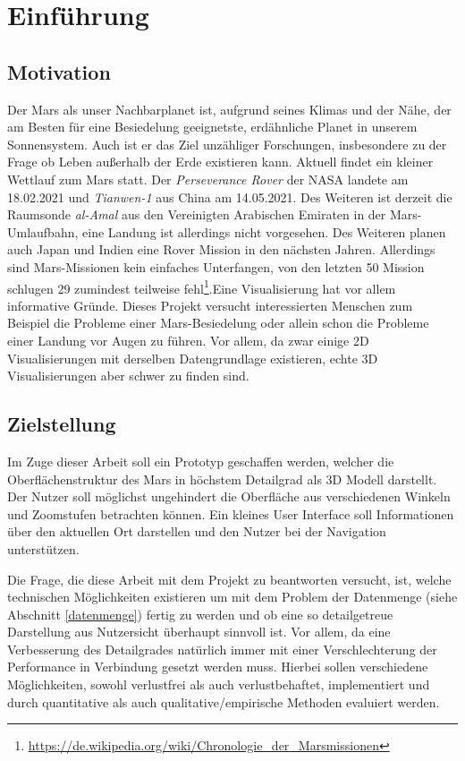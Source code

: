 \chapter{Einführung}

\section{Motivation}
Der Mars als unser Nachbarplanet ist, aufgrund seines Klimas und der Nähe, der am Besten für eine Besiedelung geeignetste, erdähnliche Planet in unserem Sonnensystem. Auch ist er das Ziel unzähliger Forschungen, insbesondere zu der Frage ob Leben außerhalb der Erde existieren kann. Aktuell findet ein kleiner Wettlauf zum Mars statt. Der \textit{Perseverance Rover} der NASA landete am 18.02.2021 und \textit{Tianwen-1} aus China am 14.05.2021. Des Weiteren ist derzeit die Raumsonde \textit{al-Amal} aus den Vereinigten Arabischen Emiraten in der Mars-Umlaufbahn, eine Landung ist allerdings nicht vorgesehen. Des Weiteren planen auch Japan und Indien eine Rover Mission in den nächsten Jahren. Allerdings sind Mars-Missionen kein einfaches Unterfangen, von den letzten 50 Mission schlugen 29 zumindest teilweise fehl\footnote{\url{https://de.wikipedia.org/wiki/Chronologie_der_Marsmissionen}}.Eine Visualisierung hat vor allem informative Gründe. Dieses Projekt versucht interessierten Menschen zum Beispiel die Probleme einer Mars-Besiedelung oder allein schon die Probleme einer Landung vor Augen zu führen. Vor allem, da zwar einige 2D Visualisierungen mit derselben Datengrundlage existieren, echte 3D Visualisierungen aber schwer zu finden sind.

\section{Zielstellung}
Im Zuge dieser Arbeit soll ein Prototyp geschaffen werden, welcher die Oberflächenstruktur des Mars in höchstem Detailgrad als 3D Modell darstellt. Der Nutzer soll möglichst ungehindert die Oberfläche aus verschiedenen Winkeln und Zoomstufen betrachten können. Ein kleines User Interface soll Informationen über den aktuellen Ort darstellen und den Nutzer bei der Navigation unterstützen.

Die Frage, die diese Arbeit mit dem Projekt zu beantworten versucht, ist, welche technischen Möglichkeiten existieren um mit dem Problem der Datenmenge (siehe Abschnitt \ref{datenmenge}) fertig zu werden und ob eine so detailgetreue Darstellung aus Nutzersicht überhaupt sinnvoll ist. Vor allem, da eine Verbesserung des Detailgrades natürlich immer mit einer Verschlechterung der Performance in Verbindung gesetzt werden muss. Hierbei sollen verschiedene Möglichkeiten, sowohl verlustfrei als auch verlustbehaftet, implementiert und durch quantitative als auch qualitative/empirische Methoden evaluiert werden.

